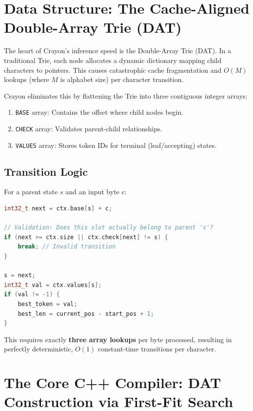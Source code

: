 \documentclass[11pt,a4paper,twocolumn]{article}
\begin{document}
\section{Data Structure: The Cache-Aligned Double-Array Trie (DAT)}
\label{sec:dat}

The heart of Crayon's inference speed is the Double-Array Trie (DAT). In a traditional Trie, each node allocates a dynamic dictionary mapping child characters to pointers. This causes catastrophic cache fragmentation and $O(M)$ lookups (where $M$ is alphabet size) per character transition.

Crayon eliminates this by flattening the Trie into three contiguous integer arrays:
\begin{enumerate}
    \item \texttt{BASE} array: Contains the offset where child nodes begin.
    \item \texttt{CHECK} array: Validates parent-child relationships.
    \item \texttt{VALUES} array: Stores token IDs for terminal (leaf/accepting) states.
\end{enumerate}

\subsection{Transition Logic}

For a parent state $s$ and an input byte $c$:

\begin{lstlisting}[language=C++,caption=DAT Transition Logic]
int32_t next = ctx.base[s] + c;

// Validation: Does this slot actually belong to parent 's'?
if (next >= ctx.size || ctx.check[next] != s) {
    break; // Invalid transition
}

s = next;
int32_t val = ctx.values[s];
if (val != -1) {
    best_token = val;
    best_len = current_pos - start_pos + 1;
}
\end{lstlisting}

This requires exactly \textbf{three array lookups} per byte processed, resulting in perfectly deterministic, $O(1)$ constant-time transitions per character.

\section{The Core C++ Compiler: DAT Construction via First-Fit Search}
\label{sec:compiler}
\end{document}
